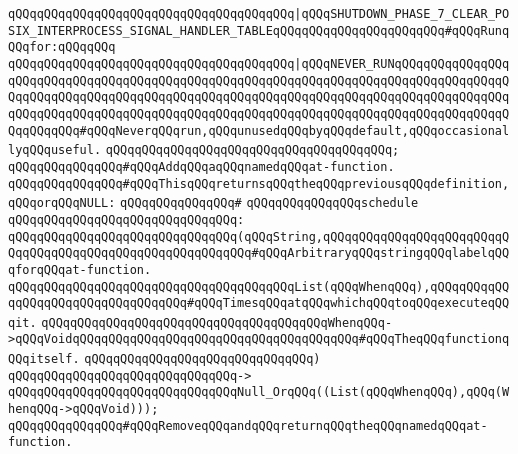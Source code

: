 \verb|qQQqqQQqqQQqqQQqqQQqqQQqqQQqqQQqqQQqqQQq|\verb#|qQQqSHUTDOWN_PHASE_7_CLEAR_POSIX_INTERPROCESS_SIGNAL_HANDLER_TABLEqQQqqQQqqQQqqQQqqQQqqQQq#\verb|#qQQqRunqQQqfor:qQQqqQQq|\newline
\newline
\newline
\verb|qQQqqQQqqQQqqQQqqQQqqQQqqQQqqQQqqQQqqQQq|\verb#|qQQqNEVER_RUNqQQqqQQqqQQqqQQqqQQqqQQqqQQqqQQqqQQqqQQqqQQqqQQqqQQqqQQqqQQqqQQqqQQqqQQqqQQqqQQqqQQqqQQqqQQqqQQqqQQqqQQqqQQqqQQqqQQqqQQqqQQqqQQqqQQqqQQqqQQqqQQqqQQqqQQqqQQqqQQqqQQqqQQqqQQqqQQqqQQqqQQqqQQqqQQqqQQqqQQqqQQqqQQqqQQqqQQqqQQqqQQqqQQqqQQqqQQq#\verb|#qQQqNeverqQQqrun,qQQqunusedqQQqbyqQQqdefault,qQQqoccasionallyqQQquseful.|\newline
\verb|qQQqqQQqqQQqqQQqqQQqqQQqqQQqqQQqqQQqqQQq;|\newline
\newline
\verb|qQQqqQQqqQQqqQQq#qQQqAddqQQqaqQQqnamedqQQqat-function.|\newline
\verb|qQQqqQQqqQQqqQQq#qQQqThisqQQqreturnsqQQqtheqQQqpreviousqQQqdefinition,qQQqorqQQqNULL:|\newline
\verb|qQQqqQQqqQQqqQQq#|\newline
\verb|qQQqqQQqqQQqqQQqschedule|\newline
\verb|qQQqqQQqqQQqqQQqqQQqqQQqqQQqqQQq:|\newline
\verb|qQQqqQQqqQQqqQQqqQQqqQQqqQQqqQQq(qQQqString,qQQqqQQqqQQqqQQqqQQqqQQqqQQqqQQqqQQqqQQqqQQqqQQqqQQqqQQqqQQq#qQQqArbitraryqQQqstringqQQqlabelqQQqforqQQqat-function.|\newline
\verb|qQQqqQQqqQQqqQQqqQQqqQQqqQQqqQQqqQQqqQQqList(qQQqWhenqQQq),qQQqqQQqqQQqqQQqqQQqqQQqqQQqqQQqqQQq#qQQqTimesqQQqatqQQqwhichqQQqtoqQQqexecuteqQQqit.|\newline
\verb|qQQqqQQqqQQqqQQqqQQqqQQqqQQqqQQqqQQqqQQqWhenqQQq->qQQqVoidqQQqqQQqqQQqqQQqqQQqqQQqqQQqqQQqqQQqqQQq#qQQqTheqQQqfunctionqQQqitself.|\newline
\verb|qQQqqQQqqQQqqQQqqQQqqQQqqQQqqQQq)|\newline
\verb|qQQqqQQqqQQqqQQqqQQqqQQqqQQqqQQq->|\newline
\verb|qQQqqQQqqQQqqQQqqQQqqQQqqQQqqQQqNull_OrqQQq((List(qQQqWhenqQQq),qQQq(WhenqQQq->qQQqVoid)));|\newline
\newline
\verb|qQQqqQQqqQQqqQQq#qQQqRemoveqQQqandqQQqreturnqQQqtheqQQqnamedqQQqat-function.|\newline
